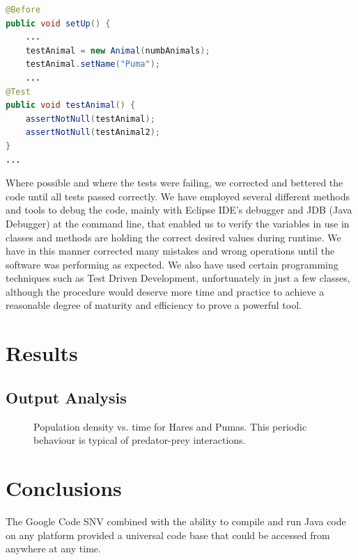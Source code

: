 \documentclass[11pt]{report}
\begin{document}
\begin{lstlisting}[language=Java,caption= Use of JUnit directives in test cases]
@Before
public void setUp() {
    ...
    testAnimal = new Animal(numbAnimals);
    testAnimal.setName("Puma");
    ...
@Test
public void testAnimal() {
    assertNotNull(testAnimal);
    assertNotNull(testAnimal2);
} 
...
\end{lstlisting}

Where possible and where the tests were failing, we corrected and bettered the code until all tests passed correctly. We have employed several different methods and tools to debug the code, mainly with Eclipse IDE's debugger and JDB (Java Debugger) at the command line, that enabled us to verify the variables in use in classes and methods are holding the correct desired values during runtime. We have in this manner corrected many mistakes and wrong operations until the software was performing as expected. We also have used certain programming techniques such as Test Driven Development, unfortunately in just a few classes, although the procedure would deserve more time and practice to achieve a reasonable degree of maturity and efficiency to prove a powerful tool. 

\chapter{Results}

	\section{Output Analysis}
	\begin{figure}[h]
   
   
   \caption{Population density vs. time for Hares and Pumas. This periodic behaviour is typical of predator-prey interactions.}
   \end{figure}

   

\chapter{Conclusions} %

	The Google Code SNV combined with the ability to compile and run Java code on any platform provided a universal code base that could be accessed from anywhere at any time.    
\end{document}
